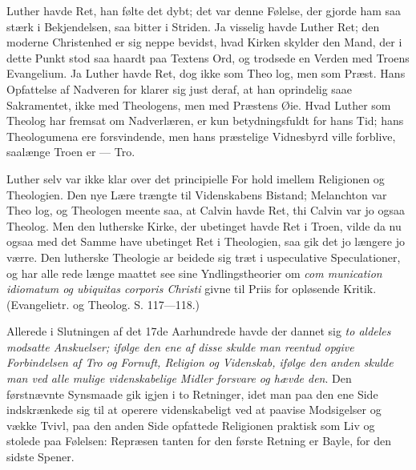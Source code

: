 \documentclass[12pt]{book}
\newcommand{\opage}[1]{\marginnote{\footnotesize\textit{[#1]}}}
\begin{document}
Luther havde Ret, han følte det dybt; det var denne
Følelse, der gjorde ham saa stærk i Bekjendelsen, saa
bitter i Striden. Ja visselig havde Luther Ret; den
moderne Christenhed er sig neppe bevidst, hvad Kirken
skylder den Mand, der i dette Punkt stod saa haardt
paa Textens Ord, og trodsede en Verden med Troens
Evangelium. Ja Luther havde Ret, dog ikke som Theo\-%
log, men som Præst. Hans Opfattelse af Nadveren for\-%
klarer sig just deraf, at han oprindelig saae Sakramentet,
ikke med Theologens, men med Præstens Øie. Hvad
Luther som Theolog har fremsat om Nadverlæren, er
kun betydningsfuldt for hans Tid; hans Theologumena
\opage{267}\setcounter{footnote}{0}%
ere forsvindende, men hans præstelige Vidnesbyrd ville
forblive, saalænge Troen er --- Tro.

Luther selv var ikke klar over det principielle For\-%
hold imellem Religionen og Theologien. Den nye Lære
trængte til Videnskabens Bistand; Melanchton var Theo\-%
log, og Theologen meente saa, at Calvin havde Ret, thi
Calvin var jo ogsaa Theolog. Men den lutherske Kirke,
der ubetinget havde Ret i Troen, vilde da nu ogsaa med
det Samme have ubetinget Ret i Theologien, saa gik
det jo længere jo værre. Den lutherske Theologie ar\-%
beidede sig træt i uspeculative Speculationer, og har alle\-%
rede længe maattet see sine Yndlingstheorier om \textit{com\-%
munication idiomatum og ubiquitas corporis Christi} givne
til Priis for opløsende Kritik. (Evangelietr. og Theolog.
S. 117---118.)

Allerede i Slutningen af det 17de Aarhundrede havde
der dannet sig \textit{to aldeles modsatte Anskuelser; ifølge den
ene af disse skulde man reentud opgive Forbindelsen af Tro
og Fornuft, Religion og Videnskab, ifølge den anden skulde
man ved alle mulige videnskabelige Midler forsvare og
hævde den}. Den førstnævnte Synsmaade gik igjen i to
Retninger, idet man paa den ene Side indskrænkede sig
til at operere videnskabeligt ved at paavise Modsigelser
og vække Tvivl, paa den anden Side opfattede Religionen
praktisk som Liv og stolede paa Følelsen: Repræsen\-%
tanten for den første Retning er Bayle, for den sidste
Spener.
\end{document}
